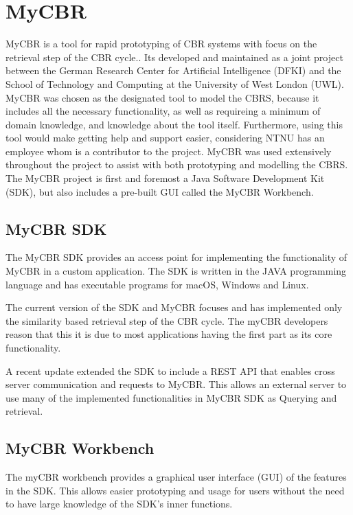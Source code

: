 \section{MyCBR}

MyCBR is a tool for rapid prototyping of CBR systems with focus on the retrieval step of the CBR cycle.\cite{MyCBR}. Its developed and maintained as a joint project between the German Research Center for Artificial Intelligence (DFKI) and the School of Technology and Computing at the University of West London (UWL)\cite{Stahl2008}. MyCBR was chosen as the designated tool to model the CBRS, because it includes all the necessary functionality, as well as requireing a minimum of domain knowledge, and knowledge about the tool itself. Furthermore, using this tool would make getting help and support easier, considering NTNU has an employee whom is a contributor to the project. MyCBR was used extensively throughout the project to assist with both prototyping and modelling the CBRS. The MyCBR project is first and foremost a Java Software Development Kit (SDK), but also includes a pre-built GUI called the MyCBR Workbench. 

\subsection{MyCBR SDK}
The MyCBR SDK provides an access point for implementing the functionality of MyCBR in a custom application. The SDK is written in the JAVA programming language and has executable programs for macOS, Windows and Linux\cite{MyCBR}. 

The current version of the SDK and MyCBR focuses and has implemented only the similarity based retrieval step of the CBR cycle. The myCBR developers reason that this it is due to most applications having the first part as its core functionality\cite{Stahl2008}.  

A recent update extended the SDK to include a REST API that enables cross server communication and requests to MyCBR. This allows an external server to use many of the implemented functionalities in MyCBR SDK as Querying and retrieval.

\subsection{MyCBR Workbench}

The myCBR workbench provides a graphical user interface (GUI) of the features in the SDK. This allows easier prototyping and usage for users without the need to have large knowledge of the SDK's inner functions\cite{bach2014knowledge}. 

